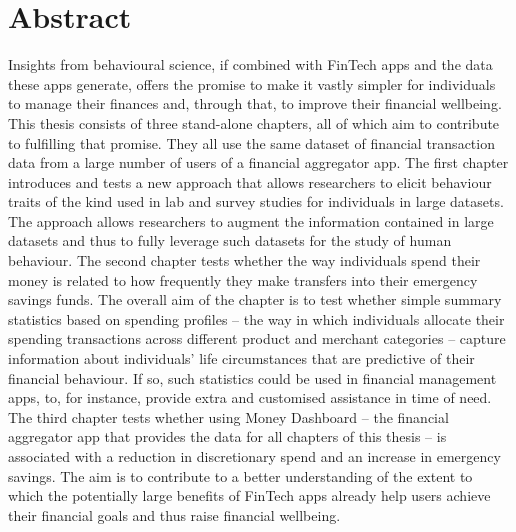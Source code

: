 
\chapter*{Abstract}%
\label{cha:abstract}

Insights from behavioural science, if combined with FinTech apps and the data
these apps generate, offers the promise to make it vastly simpler for
individuals to manage their finances and, through that, to improve their
financial wellbeing. This thesis consists of three stand-alone chapters, all of
which aim to contribute to fulfilling that promise. They all use the same
dataset of financial transaction data from a large number of users of a
financial aggregator app. The first chapter introduces and tests a new approach
that allows researchers to elicit behaviour traits of the kind used in lab and
survey studies for individuals in large datasets. The approach allows
researchers to augment the information contained in large datasets and thus to
fully leverage such datasets for the study of human behaviour. The second
chapter tests whether the way individuals spend their money is related to how
frequently they make transfers into their emergency savings funds. The overall
aim of the chapter is to test whether simple summary statistics based on
spending profiles -- the way in which individuals allocate their
spending transactions across different product and merchant categories --
capture information about individuals' life circumstances that are predictive
of their financial behaviour. If so, such statistics could be used in financial
management apps, to, for instance, provide extra and customised assistance in
time of need. The third chapter tests whether using Money Dashboard -- the
financial aggregator app that provides the data for all chapters of this thesis
-- is associated with a reduction in discretionary spend and an increase in
emergency savings. The aim is to contribute to a better understanding of the
extent to which the potentially large benefits of FinTech apps already help
users achieve their financial goals and thus raise financial wellbeing.


